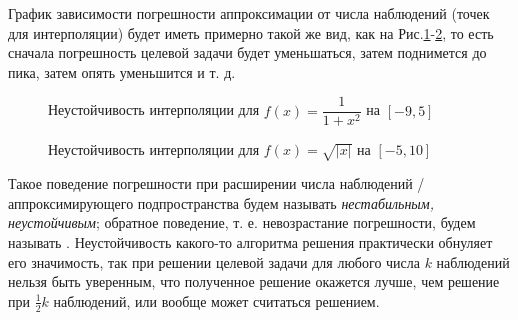\documentclass[a4paper]{article}
\begin{document}
График зависимости погрешности аппроксимации от числа наблюдений (точек для интерполяции) будет иметь примерно такой же вид, как на Рис.\ref{runge1}-\ref{runge2}, то есть
сначала погрешность целевой задачи будет уменьшаться, затем поднимется до пика, затем опять уменьшится и т. д.

\begin{figure}[!h]
  \noindent{}
  \caption{Неустойчивость интерполяции для $f(x)=\dfrac{1}{1+x^2}$ на $[-9,5]$}
  \label{runge1}
\end{figure}
\begin{figure}[!h]
  \noindent{}
  \caption{Неустойчивость интерполяции для $f(x)=\sqrt{|x|}$ на $[-5,10]$}
  \label{runge2}
\end{figure}

Такое поведение погрешности при расширении числа наблюдений / аппроксимирующего подпространства будем называть {\it нестабильным, неустойчивым}; обратное поведение, т. е. невозрастание погрешности, будем называть {}.
Неустойчивость какого-то алгоритма решения практически обнуляет его значимость,
так при решении целевой задачи для любого числа $k$ наблюдений нельзя быть уверенным, что полученное решение окажется лучше, чем решение при $\frac{1}{2}k$ наблюдений, или вообще может считаться решением.    
\end{document}
